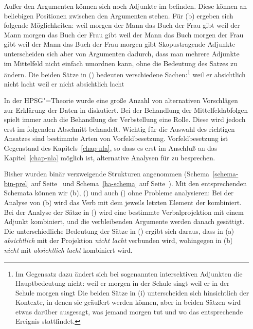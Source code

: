 Außer den Argumenten können sich noch Adjunkte im \mf befinden. Diese können
an beliebigen Positionen zwischen den Argumenten stehen. Für (b) ergeben
sich \zb folgende Möglichkeiten:
\eal
\label{bsp-adj-mf}
\ex weil morgen der Mann das Buch der Frau gibt
\ex weil der Mann morgen das Buch der Frau gibt
\ex weil der Mann das Buch morgen der Frau gibt
\ex weil der Mann das Buch der Frau morgen gibt
\zl
Skopustragende Adjunkte unterscheiden sich aber von Argumenten dadurch, dass man mehrere
Adjunkte im Mittelfeld nicht einfach umordnen kann, ohne die Bedeutung des Satzes zu ändern.
Die beiden Sätze in () bedeuten verschiedene Sachen:\footnote{
  Im Gegensatz dazu ändert sich bei sogenannten intersektiven Adjunkten die Hauptbedeutung nicht:
\eal
\ex weil er morgen in der Schule singt
\ex weil er in der Schule morgen singt
\zl
Die beiden Sätze in (i) unterscheiden sich hinsichtlich der Kontexte, in denen sie geäußert
werden können, aber in beiden Sätzen wird etwas darüber ausgesagt, was jemand morgen tut und wo
das entsprechende Ereignis stattfindet.%
}
\eal{}
\label{bsp-absichtlich-nicht}
\ex weil er absichtlich nicht lacht
\ex weil er nicht absichtlich lacht
\zl

\noindent
In der HPSG"=Theorie wurde eine große Anzahl von alternativen Vorschlägen zur Erklärung der
Daten in  diskutiert. Bei der Behandlung der Mittelfeldabfolgen
spielt immer auch die Behandlung der Verbstellung eine Rolle. Diese wird jedoch erst im
folgenden Abschnitt behandelt. Wichtig für die Auswahl des richtigen Ansatzes sind
bestimmte Arten von Vorfeldbesetzung. Vorfeldbesetzung ist Gegenstand des Kapitels~\ref{chap-nla},
so dass es erst im Anschluß an das Kapitel~\ref{chap-nla} möglich ist, alternative
Analysen für  zu besprechen.

Bisher wurden binär verzweigende Strukturen angenommen (Schema~\ref{schema-bin-prel} auf
Seite~\pageref{schema-bin-prel} und Schema~\ref{ha-schema} auf Seite~\pageref{ha-schema}).
Mit den entsprechenden Schemata können wir (b), () und auch ()
ohne Probleme analysieren: Bei der Analyse von (b) wird das Verb mit dem jeweils
letzten Element der \compsl kombiniert. Bei der Analyse der Sätze in ()
wird eine bestimmte Verbalprojektion mit einem Adjunkt kombiniert, und die verbleibenden
Argumente werden danach gesättigt. Die unterschiedliche Bedeutung der Sätze in ()
ergibt sich daraus, dass in (a) \emph{absichtlich} mit der Projektion \emph{nicht lacht} verbunden
wird, wohingegen in (b) \emph{nicht} mit \emph{absichtlich lacht} kombiniert wird.


